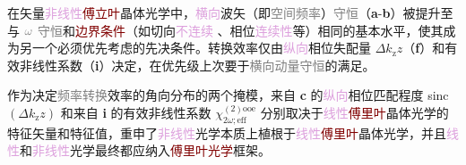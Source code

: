 在矢量\textcolor{Plum}{非线性}\textcolor{Maroon}{傅立叶}\textcolor{PineGreen}{晶体光学}中，\textcolor{Plum}{横向}\textcolor{PineGreen}{波矢}（即\textcolor{gray}{空间频率}）\textcolor{gray}{守恒}（\textbf{a}-\textbf{b}）被提升至与 $\mathcolor{gray}{\omega}$ \textcolor{gray}{守恒}和\textcolor{Maroon}{边界条件}（如切向\textcolor{Plum}{不连续} 、相位\textcolor{Plum}{连续性}等）相同的基本水平，使其成为另一个必须优先考虑的先决条件。转换效率仅由\textcolor{Plum}{纵向}\textcolor{PineGreen}{相位失配量} $\Delta k_\mathrm{z} z$（\textbf{f}）和\textcolor{PineGreen}{有效非线性系数}（\textbf{i}）决定\cite{midwinterEffectsPhaseMatching1965,yaoAccurateCalculationOptimum1992,dmitrievEffectiveNonlinearityCoefficients1993,diesperovEffectiveNonlinearCoefficient1997}，在优先级上次要于\textcolor{gray}{横向动量守恒}的满足。

作为决定\textcolor{gray}{频率转换}效率的角向分布的两个掩模，来自 \textbf{c} 的\textcolor{Plum}{纵向}\textcolor{PineGreen}{相位匹配程度} sinc$(\Delta k_\mathrm{z} z)$ 和来自 \textbf{i} 的\textcolor{PineGreen}{有效非线性系数} $\chi^{(2)\text{ooe}}_{2\omega;\text{eff}}$ 分别取决于\textcolor{Plum}{线性}\textcolor{Maroon}{傅里叶}\textcolor{PineGreen}{晶体光学}的\textcolor{PineGreen}{特征矢量}和\textcolor{PineGreen}{特征值}，重申了\textcolor{Plum}{非线性}光学本质上植根于\textcolor{Plum}{线性}\textcolor{Maroon}{傅里叶}\textcolor{PineGreen}{晶体光学}，并且\textcolor{Plum}{线性}和\textcolor{Plum}{非线性}光学最终都应纳入\textcolor{Maroon}{傅里叶光学}框架。

